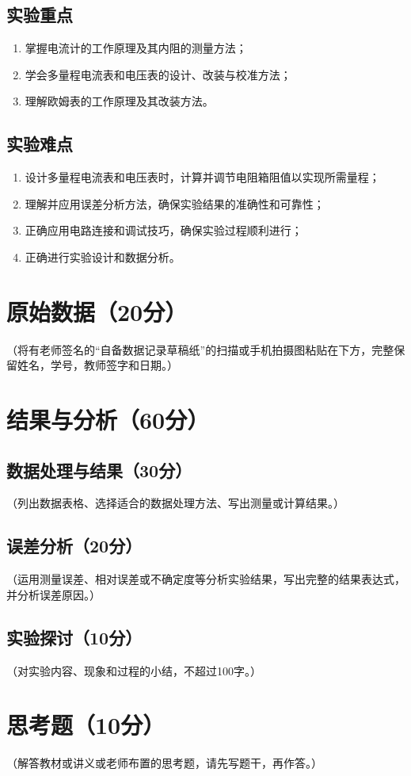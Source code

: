 \documentclass[yuxi]{../template/Preport}
\begin{document}
\subsection{实验重点}
\begin{enumerate}
    \item 掌握电流计的工作原理及其内阻的测量方法；
    \item 学会多量程电流表和电压表的设计、改装与校准方法；
    \item 理解欧姆表的工作原理及其改装方法。
\end{enumerate}
\subsection{实验难点}
\begin{enumerate}
    \item 设计多量程电流表和电压表时，计算并调节电阻箱阻值以实现所需量程；
    \item 理解并应用误差分析方法，确保实验结果的准确性和可靠性；
    \item 正确应用电路连接和调试技巧，确保实验过程顺利进行；
    \item 正确进行实验设计和数据分析。
\end{enumerate}
\begin{fullreportonly}
    \section{原始数据（20分）}
（将有老师签名的“自备数据记录草稿纸”的扫描或手机拍摄图粘贴在下方，完整保留姓名，学号，教师签字和日期。）

\section{结果与分析（60分）}
\subsection{数据处理与结果（30分）}
（列出数据表格、选择适合的数据处理方法、写出测量或计算结果。）

\subsection{误差分析（20分）}
（运用测量误差、相对误差或不确定度等分析实验结果，写出完整的结果表达式，并分析误差原因。）

\subsection{实验探讨（10分）}
（对实验内容、现象和过程的小结，不超过100字。）

\section{思考题（10分）}
（解答教材或讲义或老师布置的思考题，请先写题干，再作答。）
\end{fullreportonly}
\insertnotes
\end{document}

